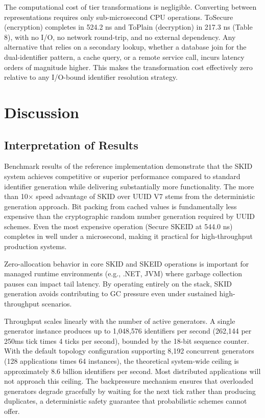\documentclass[fleqn,10pt,lineno]{wlpeerj}
\begin{document}
The computational cost of tier transformations is negligible. Converting
between representations requires only sub-microsecond CPU operations.
ToSecure (encryption) completes in 524.2 ns and ToPlain (decryption) in
217.3 ns (Table 8), with no I/O, no network round-trip, and no external
dependency. Any alternative that relies on a secondary lookup, whether a
database join for the dual-identifier pattern, a cache query, or a
remote service call, incurs latency orders of magnitude higher. This
makes the transformation cost effectively zero relative to any I/O-bound
identifier resolution strategy.

\section{Discussion}\label{discussion}

\subsection{Interpretation of Results}\label{interpretation-of-results}

Benchmark results of the reference implementation demonstrate that the
SKID system achieves competitive or superior performance compared to
standard identifier generation while delivering substantially more
functionality. The more than 10× speed advantage of SKID over UUID V7
stems from the deterministic generation approach. Bit packing from
cached values is fundamentally less expensive than the cryptographic
random number generation required by UUID schemes. Even the most
expensive operation (Secure SKEID at 544.0 ns) completes in well under a
microsecond, making it practical for high-throughput production systems.

Zero-allocation behavior in core SKID and SKEID operations is important
for managed runtime environments (e.g., .NET, JVM) where garbage
collection pauses can impact tail latency. By operating entirely on the
stack, SKID generation avoids contributing to GC pressure even under
sustained high-throughput scenarios.

Throughput scales linearly with the number of active generators. A
single generator instance produces up to 1,048,576 identifiers per
second (262,144 per 250ms tick times 4 ticks per second), bounded by the
18-bit sequence counter. With the default topology configuration
supporting 8,192 concurrent generators (128 applications times 64
instances), the theoretical system-wide ceiling is approximately 8.6
billion identifiers per second. Most distributed applications will not
approach this ceiling. The backpressure mechanism ensures that
overloaded generators degrade gracefully by waiting for the next tick
rather than producing duplicates, a deterministic safety guarantee that
probabilistic schemes cannot offer.
\end{document}
